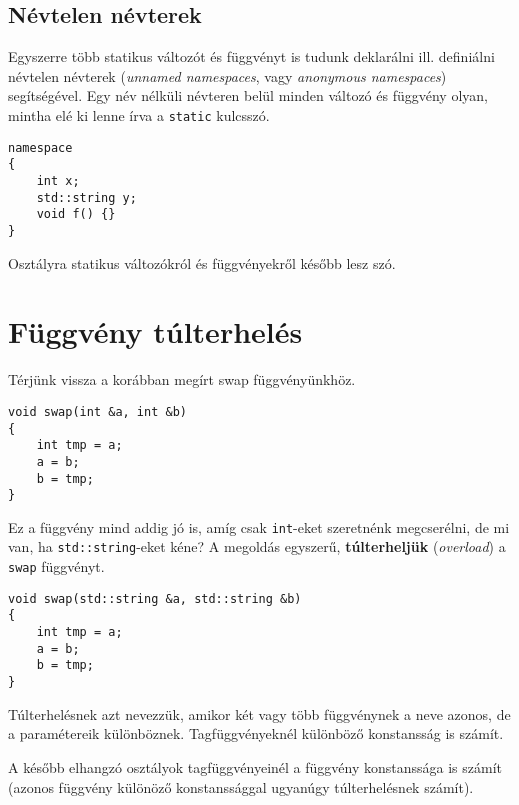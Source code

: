 \documentclass[a4paper,11.5pt]{article}
\begin{document}
	\subsection{Névtelen névterek}
	Egyszerre több statikus változót és függvényt is tudunk deklarálni ill. definiálni névtelen névterek (\textit{unnamed namespaces}, vagy \textit{anonymous namespaces}) segítségével. Egy név nélküli névteren belül minden változó és függvény olyan, mintha elé ki lenne írva a \texttt{static} kulcsszó.
	\begin{lstlisting}
namespace
{
	int x;
	std::string y;
	void f() {}
}
	\end{lstlisting}
	\begin{note}
		Osztályra statikus változókról és függvényekről később lesz szó.
	\end{note}
	\section{Függvény túlterhelés}
	Térjünk vissza a korábban megírt swap függvényünkhöz.
	\begin{lstlisting}
void swap(int &a, int &b)
{
	int tmp = a;
	a = b;
	b = tmp;
}
	\end{lstlisting}
	Ez a függvény mind addig jó is, amíg csak \texttt{int}-eket szeretnénk megcserélni, de mi van, ha \texttt{std::string}-eket kéne? A megoldás egyszerű, \textbf{túlterheljük} (\textit{overload}) a \texttt{swap} függvényt.
	\begin{lstlisting}
void swap(std::string &a, std::string &b)
{
	int tmp = a;
	a = b;
	b = tmp;
}
	\end{lstlisting}
	Túlterhelésnek azt nevezzük, amikor két vagy több függvénynek a neve azonos, de a paramétereik különböznek. Tagfüggvényeknél különböző konstansság is számít.
	\begin{note}
		A később elhangzó osztályok tagfüggvényeinél a függvény konstanssága is számít (azonos függvény különöző konstanssággal ugyanúgy túlterhelésnek számít).
	\end{note}
\end{document}
